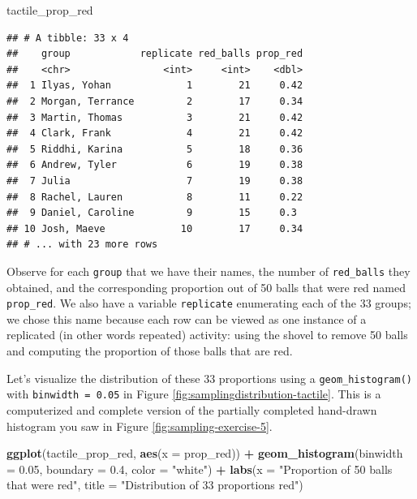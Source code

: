 \documentclass[
]{book}
\newenvironment{Shaded}{\begin{snugshade}}{\end{snugshade}}
\newcommand{\DataTypeTok}[1]{\textcolor[rgb]{0.13,0.29,0.53}{#1}}
\newcommand{\FloatTok}[1]{\textcolor[rgb]{0.00,0.00,0.81}{#1}}
\newcommand{\KeywordTok}[1]{\textcolor[rgb]{0.13,0.29,0.53}{\textbf{#1}}}
\newcommand{\NormalTok}[1]{#1}
\newcommand{\OperatorTok}[1]{\textcolor[rgb]{0.81,0.36,0.00}{\textbf{#1}}}
\newcommand{\StringTok}[1]{\textcolor[rgb]{0.31,0.60,0.02}{#1}}
\begin{document}
\begin{Shaded}
\begin{Highlighting}[]
\NormalTok{tactile_prop_red}
\end{Highlighting}
\end{Shaded}

\begin{verbatim}
## # A tibble: 33 x 4
##    group            replicate red_balls prop_red
##    <chr>                <int>     <int>    <dbl>
##  1 Ilyas, Yohan             1        21     0.42
##  2 Morgan, Terrance         2        17     0.34
##  3 Martin, Thomas           3        21     0.42
##  4 Clark, Frank             4        21     0.42
##  5 Riddhi, Karina           5        18     0.36
##  6 Andrew, Tyler            6        19     0.38
##  7 Julia                    7        19     0.38
##  8 Rachel, Lauren           8        11     0.22
##  9 Daniel, Caroline         9        15     0.3 
## 10 Josh, Maeve             10        17     0.34
## # ... with 23 more rows
\end{verbatim}

Observe for each \texttt{group} that we have their names, the number of \texttt{red\_balls} they obtained, and the corresponding proportion out of 50 balls that were red named \texttt{prop\_red}. We also have a variable \texttt{replicate} enumerating each of the 33 groups; we chose this name because each row can be viewed as one instance of a replicated (in other words repeated) activity: using the shovel to remove 50 balls and computing the proportion of those balls that are red.

Let's visualize the distribution of these 33 proportions using a \texttt{geom\_histogram()} with \texttt{binwidth\ =\ 0.05} in Figure \ref{fig:samplingdistribution-tactile}. This is a computerized and complete version of the partially completed hand-drawn histogram you saw in Figure \ref{fig:sampling-exercise-5}.

\begin{Shaded}
\begin{Highlighting}[]
\KeywordTok{ggplot}\NormalTok{(tactile_prop_red, }\KeywordTok{aes}\NormalTok{(}\DataTypeTok{x =}\NormalTok{ prop_red)) }\OperatorTok{+}
\StringTok{  }\KeywordTok{geom_histogram}\NormalTok{(}\DataTypeTok{binwidth =} \FloatTok{0.05}\NormalTok{, }\DataTypeTok{boundary =} \FloatTok{0.4}\NormalTok{, }\DataTypeTok{color =} \StringTok{"white"}\NormalTok{) }\OperatorTok{+}
\StringTok{  }\KeywordTok{labs}\NormalTok{(}\DataTypeTok{x =} \StringTok{"Proportion of 50 balls that were red"}\NormalTok{, }
       \DataTypeTok{title =} \StringTok{"Distribution of 33 proportions red"}\NormalTok{) }
\end{Highlighting}
\end{Shaded}
\end{document}
